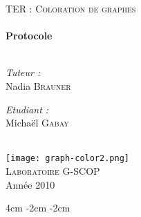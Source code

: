 \begin{titlepage}
\begin{center}

\quad %
 
\textsc{\Large TER : Coloration de graphes}\\[0.5cm]

\HRule \\[0.5cm]
{ \huge \bfseries Protocole}\\[0.4cm]  %
 
\HRule \\[1.5cm]

\begin{minipage}{0.4\textwidth}
\begin{flushleft} \large
\emph{Tuteur :}\\
Nadia \textsc{Brauner}
\end{flushleft}
\end{minipage}
\begin{minipage}{0.4\textwidth}
\begin{flushright} \large
\emph{Etudiant :} \\

Michaël \textsc{Gabay}\\
\end{flushright}
\end{minipage}


\quad \\[1.5cm]

\texttt{[image: graph-color2.png]} \\[0.75cm]

\textsc{\LARGE Laboratoire G-SCOP}\\[1.5cm]

\vfill 
{\large Année 2010}

\end{center} 
\end{titlepage}

\changepage	{}%
           		{4cm}%
           		{-2cm}%
           		{-2cm}%
           		{}%
           		{}%
           		{}%
           		{}%
           		{}%
